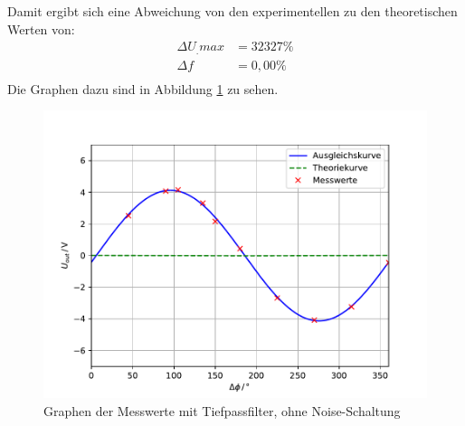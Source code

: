 Damit ergibt sich eine Abweichung von den experimentellen zu den theoretischen Werten von:
\begin{align*}
\Delta U_.{max} &= 32327\% \\
\Delta f		&= 0,00\% \\
\end{align*}
Die Graphen dazu sind in Abbildung \ref{fig:U2} zu sehen.
\begin{figure}
\centering
\includegraphics[scale=0.5]{content/images/plot.pdf}
\caption{Graphen der Messwerte mit Tiefpassfilter, ohne Noise-Schaltung}
\label{fig:U2}
\end{figure}
